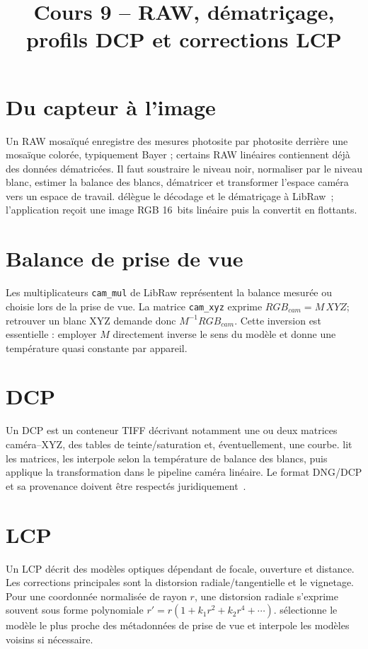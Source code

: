 
\title{Cours 9 -- RAW, dématriçage, profils DCP et corrections LCP}


\section{Du capteur à l'image}
Un RAW mosaïqué enregistre des mesures photosite par photosite derrière une mosaïque colorée, typiquement Bayer ; certains RAW linéaires contiennent déjà des données dématricées. Il faut soustraire le niveau noir, normaliser par le niveau blanc, estimer la balance des blancs, dématricer et transformer l'espace caméra vers un espace de travail. \IPR{} délègue le décodage et le dématriçage à LibRaw~\cite{libraw}; l'application reçoit une image RGB 16~bits linéaire puis la convertit en flottants.

\section{Balance de prise de vue}
Les multiplicateurs \texttt{cam\_mul} de LibRaw représentent la balance mesurée ou choisie lors de la prise de vue. La matrice \texttt{cam\_xyz} exprime $RGB_{cam}=M\,XYZ$; retrouver un blanc XYZ demande donc $M^{-1}RGB_{cam}$. Cette inversion est essentielle : employer $M$ directement inverse le sens du modèle et donne une température quasi constante par appareil.

\section{DCP}
Un DCP est un conteneur TIFF décrivant notamment une ou deux matrices caméra--XYZ, des tables de teinte/saturation et, éventuellement, une courbe. \IPR{} lit les matrices, les interpole selon la température de balance des blancs, puis applique la transformation dans le pipeline caméra linéaire. Le format DNG/DCP et sa provenance doivent être respectés juridiquement~\cite{dngSpec}.

\section{LCP}
Un LCP décrit des modèles optiques dépendant de focale, ouverture et distance. Les corrections principales sont la distorsion radiale/tangentielle et le vignetage. Pour une coordonnée normalisée de rayon $r$, une distorsion radiale s'exprime souvent sous forme polynomiale $r'=r(1+k_1r^2+k_2r^4+\cdots)$. \IPR{} sélectionne le modèle le plus proche des métadonnées de prise de vue et interpole les modèles voisins si nécessaire.

